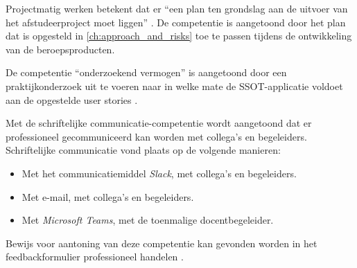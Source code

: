\documentclass[../report.tex]{subfiles}
\begin{document}
Projectmatig werken betekent dat er ``een plan ten grondslag aan de uitvoer van het afstudeerproject moet liggen'' \parencite{handleiding_afstudeerproject}. De competentie is aangetoond door het plan dat is opgesteld in \autoref{ch:approach_and_risks} toe te passen tijdens de ontwikkeling van de beroepsproducten.

De competentie ``onderzoekend vermogen'' is aangetoond door een praktijkonderzoek uit te voeren naar in welke mate de SSOT-applicatie voldoet aan de opgestelde user stories \parencite{research_report}.

Met de schriftelijke communicatie-competentie wordt aangetoond dat er professioneel gecommuniceerd kan worden met collega's en begeleiders. Schriftelijke communicatie vond plaats op de volgende manieren:

\begin{itemize}
    \item Met het communicatiemiddel \textit{Slack}, met collega's en begeleiders.
    \item Met e-mail, met collega's en begeleiders.
    \item Met \textit{Microsoft Teams}, met de toenmalige docentbegeleider.
\end{itemize}

Bewijs voor aantoning van deze competentie kan gevonden worden in het feedbackformulier professioneel handelen \parencite{feedbackformulier_professioneel_handelen}.
\end{document}
